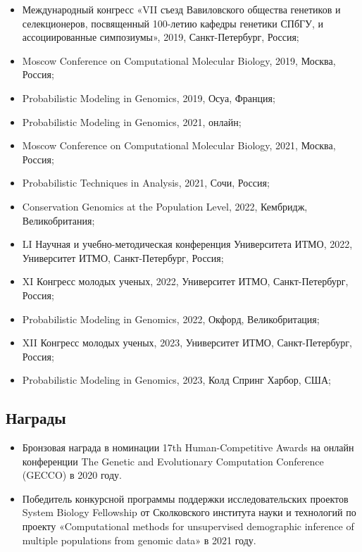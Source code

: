 \documentclass[a4paper,14pt,oneside,openany,article]{memoir}
\begin{document}
\begin{itemize}
    \item Международный конгресс «VII съезд Вавиловского общества генетиков и селекционеров, посвященный 100-летию кафедры генетики СПбГУ, и ассоциированные симпозиумы», 2019, Санкт-Петербург, Россия;
    \item Moscow Conference on Computational Molecular Biology, 2019, Москва, Россия;
    \item Probabilistic Modeling in Genomics, 2019, Осуа, Франция;
    \item Probabilistic Modeling in Genomics, 2021, онлайн;
    \item Moscow Conference on Computational Molecular Biology, 2021, Москва, Россия;
    \item Probabilistic Techniques in Analysis, 2021, Сочи, Россия;
    \item Conservation Genomics at the Population Level, 2022, Кембридж, Великобритания;
    \item LI Научная и учебно-методическая конференция Университета ИТМО, 2022, Университет ИТМО, Санкт-Петербург, Россия;
    \item XI Конгресс молодых ученых, 2022, Университет ИТМО, Санкт-Петербург, Россия;
    \item Probabilistic Modeling in Genomics, 2022, Окфорд, Великобритация;
    \item XII Конгресс молодых ученых, 2023, Университет ИТМО, Санкт-Петербург, Россия;
    \item Probabilistic Modeling in Genomics, 2023, Колд Спринг Харбор, США;\\
\end{itemize}

\subsection*{Награды}

\begin{itemize}
    \item Бронзовая награда в номинации 17th Human-Competitive Awards на онлайн конференции The Genetic and Evolutionary Computation Conference (GECCO) в 2020 году.
    \item Победитель конкурсной программы поддержки исследовательских проектов System Biology Fellowship от Сколковского института науки и технологий по проекту «Computational methods for unsupervised demographic inference of multiple populations from genomic data» в 2021 году.
\end{itemize}
\end{document}
